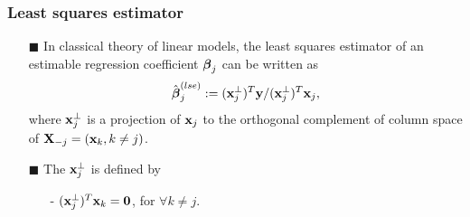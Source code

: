 \begin{frame}
\frametitle{Least squares estimator}
\begin{itemize}

\item[$\blacksquare$] In classical theory of linear models, the least squares estimator of an estimable regression coefficient $\mbox{\boldmath $\beta$}_{j}$ can be written as  %
\begin{equation}
\hat{\mbox{\boldmath $\beta$}}^{(lse)}_{j} := (\mbox{\bf x}^{\bot}_{j})^T \mbox{\bf y} /(\mbox{\bf x}^{\bot}_{j})^T \mbox{\bf x}_{j},
\end{equation}
where $\mbox{\bf x}^{\bot}_{j}$ is a projection of $\mbox{\bf x}_{j}$ to the orthogonal complement of column space of $\mbox{\bf X}_{-j}=(\mbox{\bf x}_{k},k\neq j)$.

\item[$\blacksquare$] The $\mbox{\bf x}^{\perp}_{j}$ is defined by
\begin{itemize}
      \item[-] $(\mbox{\bf x}^{\bot}_{j})^T \mbox{\bf x}_{k}=\mbox{\bf 0} $, for $ \forall k\neq j$.
      \medskip

\vspace{3mm}

\end{itemize}

\end{itemize}


\end{frame}


